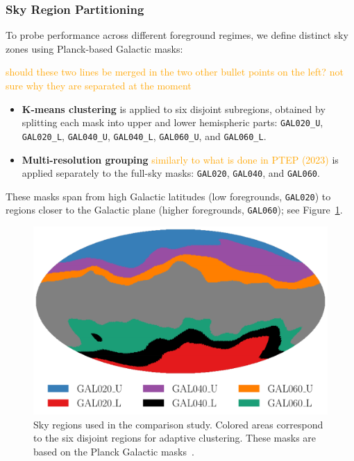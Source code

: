 \documentclass[fleqn,usenatbib]{mnras}
\newcommand{\je}[1]{\textcolor{orange}{#1}}
\begin{document}
\subsubsection*{Sky Region Partitioning}

To probe performance across different foreground regimes, we define distinct sky zones using Planck-based Galactic masks:

\je{should these two lines be merged in the two other bullet points on the left? not sure why they are separated at the moment}
\begin{itemize}
    \item \textbf{K-means clustering} is applied to six disjoint subregions, obtained by splitting each mask into upper and lower hemispheric parts: \texttt{GAL020\_U}, \texttt{GAL020\_L}, \texttt{GAL040\_U}, \texttt{GAL040\_L}, \texttt{GAL060\_U}, and \texttt{GAL060\_L}.
    \item \textbf{Multi-resolution grouping} \je{similarly to what is done in PTEP (2023)} is applied separately to the full-sky masks: \texttt{GAL020}, \texttt{GAL040}, and \texttt{GAL060}.
\end{itemize}

These masks span from high Galactic latitudes (low foregrounds, \texttt{GAL020}) to regions closer to the Galactic plane (higher foregrounds, \texttt{GAL060}); see Figure~\ref{fig:mask_layout}.


\begin{figure}
    \centering
    \includegraphics[width=\linewidth]{figures/sky_region_mask_zones.pdf}
    \caption{
    Sky regions used in the comparison study. 
    Colored areas correspond to the six disjoint regions for adaptive clustering.
    These masks are based on the Planck Galactic masks~\citep{Planck2015Galactic}.
    }
    \label{fig:mask_layout}
\end{figure}
\end{document}
